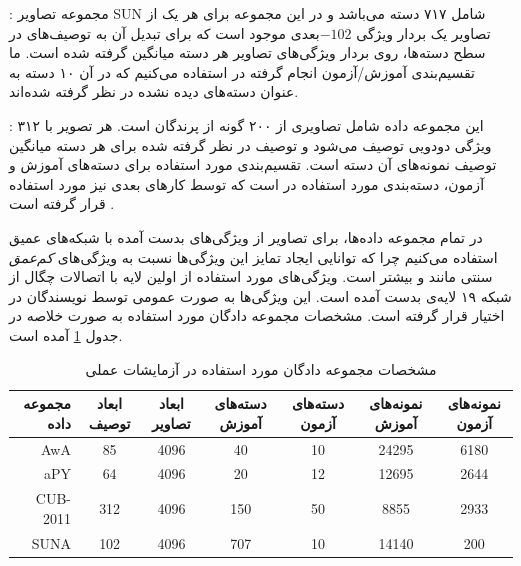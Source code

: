 \textbf{} \cite{sun}:
مجموعه تصاویر SUN شامل ۷۱۷ دسته می‌باشد و در این مجموعه برای هر یک از تصاویر یک بردار ویژگی $-102$بعدی موجود است که برای تبدیل آن به توصیف‌های در سطح دسته‌ها، روی بردار ویژگی‌های تصاویر هر دسته میانگین گرفته شده است. ما تقسیم‌بندی آموزش/آزمون انجام گرفته در \cite{jayaraman14} استفاده می‌کنیم که در آن ۱۰ دسته به عنوان دسته‌های دیده نشده در نظر گرفته شده‌اند.

 \cite{cub}:
این مجموعه داده شامل تصاویری از ۲۰۰ گونه از پرندگان است. هر تصویر با ۳۱۲ ویژگی دودویی توصیف می‌شود و توصیف در نظر گرفته شده برای هر دسته میانگین توصیف نمونه‌های آن دسته است. تقسیم‌بندی مورد استفاده برای دسته‌های آموزش و آزمون، دسته‌بندی مورد استفاده در \cite{akata13} است که توسط کارهای بعدی نیز مورد استفاده قرار گرفته است
\cite{sse, Akata2015, Reed2016}.


در تمام مجموعه داده‌ها، برای تصاویر از ویژگی‌های بدست آمده با شبکه‌های عمیق استفاده می‌کنیم چرا که توانایی ایجاد تمایز این ویژگی‌ها نسبت به ویژگی‌های
\textit{کم‌عمق}
سنتی مانند   و   بیشتر است.
ویژگی‌های مورد استفاده از  اولین لایه با اتصالات چگال از شبکه ۱۹ لایه‌ی  \cite{vgg} بدست آمده است. این ویژگی‌ها به صورت عمومی توسط نویسندگان
\cite{sse}
در اختیار قرار گرفته است.
مشخصات مجموعه دادگان مورد استفاده به صورت خلاصه در جدول \ref{tab:datasets} آمده است.
\begin{center}

\begin{table}[ht]
\centering
\caption{مشخصات مجموعه دادگان مورد استفاده در آزمایشات عملی}
\vspace{2mm}
\label{tab:datasets}
\begin{tabular}{|r|c|c|c|c|c|c|}
\hline
 مجموعه داده & ابعاد توصیف‌ & ابعاد تصاویر &  دسته‌های آموزش & دسته‌های آزمون &  نمونه‌های آموزش &  نمونه‌های آزمون \\
\hline
AwA
& 85 & 4096 & 40 & 10 & 24295 & 6180 \\\hline
 aPY
& 64 & 4096 & 20 & 12 & 12695 & 2644 \\\hline
CUB-2011
& 312 & 4096 & 150 & 50 & 8855 & 2933 \\ \hline
 SUNA
& 102 & 4096 & 707 & 10 & 14140 & 200 \\
\hline
\end{tabular}
\end{table}
\end{center}



